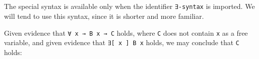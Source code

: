 \begin{fence}
\begin{code}%
\>[0]\AgdaSpace{}%
\AgdaSymbol{:}\AgdaSpace{}%
\AgdaSpace{}%
\AgdaSymbol{\{}\AgdaSpace{}%
\AgdaSymbol{:}\AgdaSpace{}%
\AgdaSymbol{\}}\AgdaSpace{}%
\AgdaSymbol{(}\AgdaSpace{}%
\AgdaSymbol{:}\AgdaSpace{}%
\AgdaSpace{}%
\AgdaSpace{}%
\AgdaSymbol{)}\AgdaSpace{}%
\AgdaSpace{}%
\<%
\\
\>[0]\AgdaSpace{}%
\AgdaSymbol{\{}\AgdaSymbol{\}}\AgdaSpace{}%
\AgdaSpace{}%
\AgdaSymbol{=}\AgdaSpace{}%
\AgdaSpace{}%
\AgdaSpace{}%
\<%
\\
%
\\[\AgdaEmptyExtraSkip]%
\>[0]\AgdaSpace{}%
\AgdaSymbol{=}\AgdaSpace{}%
\<%
\\
\>[0]\AgdaSpace{}%
\AgdaSpace{}%
\AgdaSpace{}%
\AgdaSpace{}%
\AgdaSpace{}%
\AgdaSymbol{)}\AgdaSpace{}%
\AgdaSymbol{=}\AgdaSpace{}%
\AgdaFunction{∃[}\AgdaSpace{}%
\AgdaSpace{}%
\AgdaFunction{]}\AgdaSpace{}%
\<%
\end{code}
\end{fence}

The special syntax is available only when the identifier
\texttt{∃-syntax} is imported. We will tend to use this syntax, since it
is shorter and more familiar.

Given evidence that \texttt{∀\ x\ →\ B\ x\ →\ C} holds, where \texttt{C}
does not contain \texttt{x} as a free variable, and given evidence that
\texttt{∃{[}\ x\ {]}\ B\ x} holds, we may conclude that \texttt{C}
holds:

